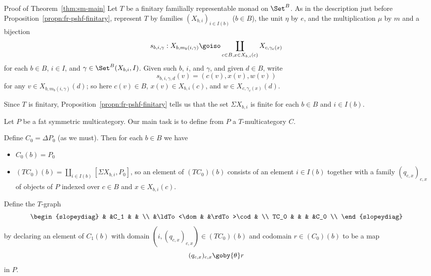 \begin{prooflike}{Proof of Theorem~\ref{thm:sm-main}}
Let $T$ be a finitary familially representable monad on $\Set^B$.  As in
the description just before Proposition~\ref{propn:fr-pshf-finitary},
represent $T$ by families $(X_{b,i})_{i\in I(b)}$ ($b\in B$), the unit
$\eta$ by $e$, and the multiplication $\mu$ by $m$ and a bijection
\[
s_{b,i,\gamma}: 
X_{b, m_b(i, \gamma)}
\goiso
\coprod_{c\in B, x\in X_{b,i}(c)} X_{c, \gamma_c(x)}
\]
for each $b\in B$, $i\in I$, and $\gamma\in \Set^B(X_{b,i}, I)$.  Given
such $b$, $i$, and $\gamma$, and given $d\in B$, write
\[
s_{b,i,\gamma,d}(v) = (c(v), x(v), w(v))
\] 
for any $v\in X_{b, m_b(i, \gamma)}(d)$; so here $c(v) \in B$, $x(v) \in
X_{b,i}(c)$, and $w \in X_{c, \gamma_c(x)}(d)$.

Since $T$ is finitary, Proposition~\ref{propn:fr-pshf-finitary} tells us
that the set $\Sigma X_{b,i}$ is finite for each $b\in B$ and $i\in I(b)$.

Let $P$ be a fat symmetric multicategory.  Our main task is to define from
$P$ a $T$-multicategory $C$.  

Define $C_0 = \Delta P_0$ (as we must).  Then for each $b\in B$ we have
%
\begin{itemize}
\item $C_0(b) = P_0$
\item $(TC_0)(b) = \coprod_{i\in I(b)} [\Sigma X_{b,i}, P_0]$, so an
element of $(TC_0)(b)$ consists of an element $i\in I(b)$ together with a
family $(q_{c,x})_{c,x}$ of objects of $P$ indexed over $c\in B$ and $x\in
X_{b,i}(c)$.
\end{itemize}

Define the $T$-graph
\[
\begin{slopeydiag}
	&		&C_1	&		&	\\
	&\ldTo<\dom	&	&\rdTo>\cod	&	\\
TC_0	&		&	&		&C_0	\\
\end{slopeydiag}
\]
by declaring an element of $C_1(b)$ with domain $(i, (q_{c,x})_{c,x}) \in
(TC_0)(b)$ and codomain $r\in (C_0)(b)$ to be a map
\[
(q_{c,x})_{c,x} \goby{\theta} r
\]
in $P$.


\end{prooflike}
